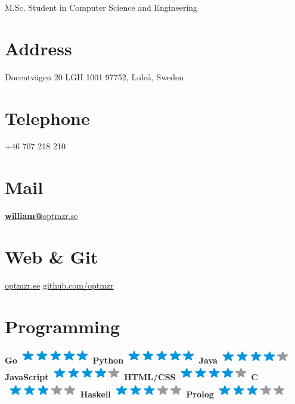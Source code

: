 \documentclass[]{friggeri-cv}
\begin{document}
      {M.Sc. Student in Computer Science and Engineering}

\begin{aside}
  \section{Address}
    Docentvägen 20 LGH 1001
    97752, Luleå, Sweden
    ~
  \section{Telephone}
    +46 707 218 210
    ~
  \section{Mail}
    \href{mailto:william@optmzr.se}{\textbf{william@}optmzr.se}
    ~
  \section{Web \& Git}
    \href{https://optmzr.se}{optmzr.se}
    \href{https://github.com/optmzr}{github.com/optmzr}
    ~
  \section{Programming}
    \textbf{Go}\includegraphics[scale=0.40]{img/5stars.png}
    \textbf{Python}\includegraphics[scale=0.40]{img/5stars.png}
    \textbf{Java}\includegraphics[scale=0.40]{img/4stars.png}
    \textbf{JavaScript}\includegraphics[scale=0.40]{img/4stars.png}
    \textbf{HTML/CSS}\includegraphics[scale=0.40]{img/4stars.png}
    \textbf{C}\includegraphics[scale=0.40]{img/3stars.png}
    \textbf{Haskell}\includegraphics[scale=0.40]{img/3stars.png}
    \textbf{Prolog}\includegraphics[scale=0.40]{img/3stars.png}
    ~

\end{aside}
\end{document}
